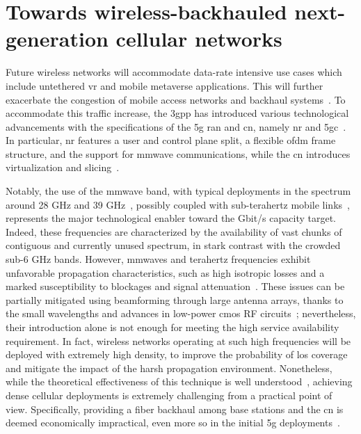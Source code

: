 \chapter{Towards wireless-backhauled next-generation cellular networks}
\label{ch:iab}


Future wireless networks will accommodate data-rate intensive use cases which include untethered \gls{vr} and mobile metaverse applications. This will further exacerbate the congestion of mobile access networks and backhaul systems~\cite{holo1}.
To accommodate this traffic increase, the \gls{3gpp} has introduced various technological advancements with the specifications of the \gls{5g} \gls{ran} and \gls{cn}, namely \gls{nr} and \gls{5gc}~\cite{3gpp_38_300}. In particular, \gls{nr} features a user and control plane split, a flexible \gls{ofdm} frame structure, and the support for \gls{mmwave} communications, while the \gls{cn} introduces virtualization and slicing~\cite{yousaf2017nfv}. 

Notably, the use of the \gls{mmwave} band, with typical deployments in the spectrum around 28 GHz and 39 GHz~\cite{shafi2017deployment}, possibly coupled with sub-terahertz mobile links~\cite{polese2020toward, 8869705}, represents the major technological enabler toward the Gbit/s capacity target. Indeed, these frequencies are characterized by the availability of vast chunks of contiguous and currently unused spectrum, in stark contrast with the crowded sub-6 GHz bands. 
However, \glspl{mmwave} and terahertz frequencies exhibit unfavorable propagation characteristics, such as high isotropic losses and a marked susceptibility to blockages and signal attenuation~\cite{khan2011mmwave, rangan2014millimeter}.
These issues can be partially mitigated using beamforming through large antenna arrays, thanks to the small wavelengths and advances in low-power \gls{cmos} RF circuits~\cite{hemadeh2017millimeter}; nevertheless, their introduction alone is not enough for meeting the high service availability requirement. 
In fact, wireless networks operating at such high frequencies will be deployed with extremely high density, to improve the probability of \gls{los} coverage and mitigate the impact of the harsh propagation environment. 
Nonetheless, while the theoretical effectiveness of this technique is well understood~\cite{gomez2017capacity}, achieving dense cellular deployments is extremely challenging from a practical point of view. Specifically, providing a fiber backhaul among base stations and the \gls{cn} is deemed economically impractical, even more so in the initial \gls{5g} deployments~\cite{polese2020integrated}. 

